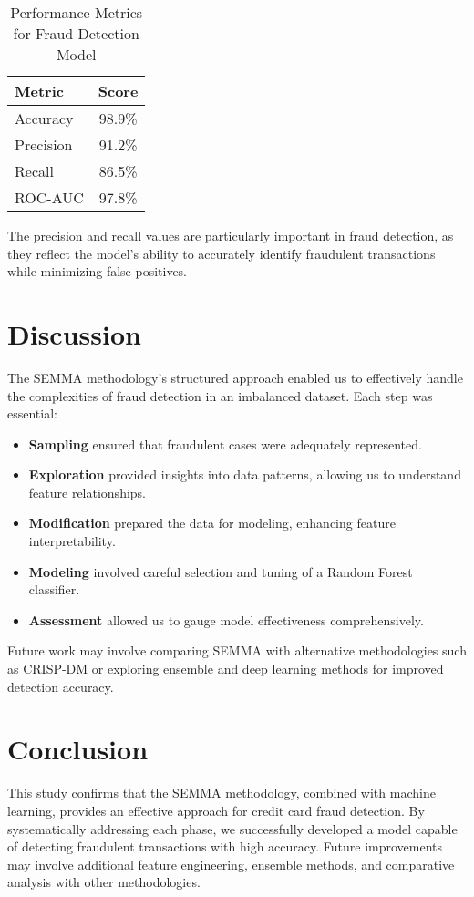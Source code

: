 \documentclass{article} %
\begin{document}
\begin{table}[h]
    \centering
    \begin{tabular}{|l|c|}
        \hline
        \textbf{Metric} & \textbf{Score} \\
        \hline
        Accuracy & 98.9\% \\
        Precision & 91.2\% \\
        Recall & 86.5\% \\
        ROC-AUC & 97.8\% \\
        \hline
    \end{tabular}
    \caption{Performance Metrics for Fraud Detection Model}
    \label{tab:results}
\end{table}

The precision and recall values are particularly important in fraud detection, as they reflect the model’s ability to accurately identify fraudulent transactions while minimizing false positives.

\section{Discussion}
The SEMMA methodology’s structured approach enabled us to effectively handle the complexities of fraud detection in an imbalanced dataset. Each step was essential:
\begin{itemize}
    \item \textbf{Sampling} ensured that fraudulent cases were adequately represented.
    \item \textbf{Exploration} provided insights into data patterns, allowing us to understand feature relationships.
    \item \textbf{Modification} prepared the data for modeling, enhancing feature interpretability.
    \item \textbf{Modeling} involved careful selection and tuning of a Random Forest classifier.
    \item \textbf{Assessment} allowed us to gauge model effectiveness comprehensively.
\end{itemize}

Future work may involve comparing SEMMA with alternative methodologies such as CRISP-DM or exploring ensemble and deep learning methods for improved detection accuracy.

\section{Conclusion}
This study confirms that the SEMMA methodology, combined with machine learning, provides an effective approach for credit card fraud detection. By systematically addressing each phase, we successfully developed a model capable of detecting fraudulent transactions with high accuracy. Future improvements may involve additional feature engineering, ensemble methods, and comparative analysis with other methodologies.
\end{document}

